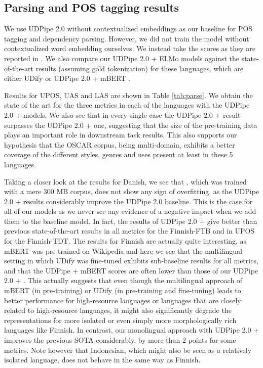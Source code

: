 \subsection{Parsing and POS tagging results}
We use UDPipe 2.0 without contextualized embeddings as our baseline for POS tagging and dependency parsing. However, we did not train the model without contextualized word embedding ourselves. We instead take the scores as they are reported in \citep{kondratyuk-straka-2019-75}. We also compare our UDPipe 2.0 + ELMo models against the state-of-the-art results (assuming gold tokenization) for these languages, which are either UDify \citep{kondratyuk-straka-2019-75} or UDPipe 2.0 + mBERT \citep{straka-strakova-2019-evaluating}.

Results for UPOS, UAS and LAS are shown in Table \ref{tab:parse}. We obtain the state of the art for the three metrics in each of the languages with the UDPipe 2.0 + \elmooscar models. We also see that in every single case the UDPipe 2.0 + \elmooscar result surpasses the UDPipe 2.0 + \elmowiki one, suggesting that the size of the pre-training data plays an important role in downstream task results. This also supports our hypothesis that the OSCAR corpus, being multi-domain, exhibits a better coverage of the different styles, genres and uses present at least in these 5 languages.

Taking a closer look at the results for Danish, we see that \elmowiki, which was trained with a mere 300 MB corpus, does not show any sign of overfitting, as the UDPipe 2.0 + \elmowiki results considerably improve the UDPipe 2.0 baseline. This is the case for all of our \elmowiki models as we never see any evidence of a negative impact when we add them to the baseline model. In fact, the results of UDPipe 2.0 + \elmowiki give better than previous state-of-the-art results in all metrics for the Finnish-FTB and in UPOS for the Finnish-TDT. The results for Finnish are actually quite interesting, as mBERT was pre-trained on Wikipedia and here we see that the multilingual setting in which UDify was fine-tuned exhibits sub-baseline results for all metrics, and that the UDPipe + mBERT scores are often lower than those of our UDPipe 2.0 + \elmowiki. This actually suggests that even though the multilingual approach of mBERT (in pre-training) or UDify (in pre-training and fine-tuning) leads to better performance for  high-resource languages or languages that are closely related to high-resource languages, it might also significantly degrade the representations for more isolated or even simply more morphologically rich languages like Finnish. In contrast, our monolingual approach with UDPipe 2.0 + \elmooscar improves the previous SOTA considerably, by more than 2 points for some metrics. Note however that Indonesian, which might also be seen as a relatively isolated language, does not behave in the same way as Finnish.

